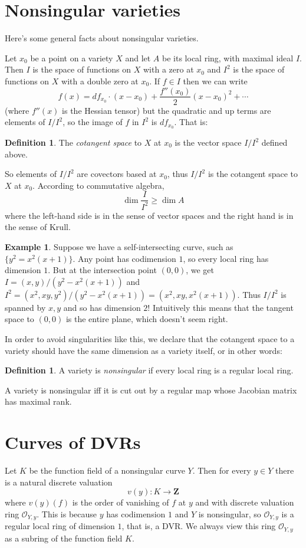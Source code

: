 \documentclass[reqno,12pt,letterpaper]{amsart}
\newcommand{\ZZ}{\mathbf{Z}}
\newcommand{\dfn}[1]{\emph{#1}\index{#1}}
\newcommand{\Olo}{\mathscr O}
\theoremstyle{definition}
\newtheorem{definition}[theorem]{Definition}
\newtheorem{example}[theorem]{Example}
\begin{document}
\section{Nonsingular varieties}
Here's some general facts about nonsingular varieties.

Let $x_0$ be a point on a variety $X$ and let $A$ be its local ring, with maximal ideal $I$.
Then $I$ is the space of functions on $X$ with a zero at $x_0$ and $I^2$ is the space of functions on $X$ with a double zero at $x_0$.
If $f \in I$ then we can write
$$f(x) = df_{x_0} \cdot (x - x_0) + \frac{f''(x_0)}{2}(x - x_0)^2 + \cdots$$
(where $f''(x)$ is the Hessian tensor)
but the quadratic and up terms are elements of $I/I^2$, so the image of $f$ in $I^2$ is $df_{x_0}$. That is:

\begin{definition}
The \dfn{cotangent space} to $X$ at $x_0$ is the vector space $I/I^2$ defined above.
\end{definition}

So elements of $I/I^2$ are covectors based at $x_0$, thus $I/I^2$ is the cotangent space to $X$ at $x_0$.
According to commutative algebra,
$$\dim \frac{I}{I^2} \geq \dim A$$
where the left-hand side is in the sense of vector spaces and the right hand is in the sense of Krull.

\begin{example}
Suppose we have a self-intersecting curve, such as $\{y^2 = x^2(x + 1)\}$.
Any point has codimension $1$, so every local ring has dimension $1$.
But at the intersection point $(0, 0)$, we get $I = (x, y)/(y^2 - x^2(x + 1))$ and $I^2 = (x^2, xy, y^2)/(y^2 - x^2(x + 1)) = (x^2, xy, x^2(x + 1))$.
Thus $I/I^2$ is spanned by $x, y$ and so has dimension $2$!
Intuitively this means that the tangent space to $(0, 0)$ is the entire plane, which doesn't seem right.
\end{example}

In order to avoid singularities like this, we declare that the cotangent space to a variety should have the same dimension as a variety itself, or in other words:

\begin{definition}
A variety is \dfn{nonsingular} if every local ring is a regular local ring.
\end{definition}

A variety is nonsingular iff it is cut out by a regular map whose Jacobian matrix has maximal rank.

\section{Curves of DVRs}
Let $K$ be the function field of a nonsingular curve $Y$.
Then for every $y \in Y$ there is a natural discrete valuation
$$v(y): K \to \ZZ$$
where $v(y)(f)$ is the order of vanishing of $f$ at $y$ and with discrete valuation ring $\Olo_{Y, y}$.
This is because $y$ has codimension $1$ and $Y$ is nonsingular, so $\Olo_{Y, y}$ is a regular local ring of dimension $1$, that is, a DVR.
We always view this ring $\Olo_{Y, y}$ as a subring of the function field $K$.
\end{document}
